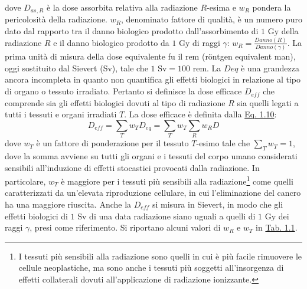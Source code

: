 \documentclass[12pt,a4paper,twoside]{report}
\begin{document}
	dove $D_{as,R}$ è la dose assorbita relativa alla radiazione $R$-esima e $w_R$ pondera la pericolosità della radiazione. $w_R$, denominato fattore di qualità, è un numero puro dato dal rapporto tra il danno biologico prodotto dall'assorbimento di $1\mbox{ Gy}$ della radiazione $R$ e il danno biologico prodotto da $1\mbox{ Gy}$ di raggi $\gamma$: $w_R=\frac{Danno(R)}{Danno(\gamma)}$. La prima unità di misura della dose equivalente fu il rem (röntgen equivalent man), oggi sostituito dal Sievert (Sv), tale che $1\mbox{ Sv}=100\mbox{ rem}$. La $D{eq}$ è una grandezza ancora incompleta in quanto non quantifica gli effetti biologici in relazione al tipo di organo o tessuto irradiato. Pertanto si definisce la dose efficace $D_{eff}$ che comprende sia gli effetti biologici dovuti al tipo di radiazione $R$ sia quelli legati a tutti i tessuti e organi irradiati $T$. La dose efficace è definita dalla \hyperref[eq:dose_eff]{Eq. 1.10}:
	\begin{equation}
		D_{eff}=\sum_{T}w_TD_{eq}=\sum_{T}w_T\sum_{R}w_RD
		\label{eq:dose_eff}
	\end{equation}
	dove $w_T$ è un fattore di ponderazione per il tessuto $T$-esimo tale che $\sum_{T}w_T=1$, dove la somma avviene su tutti gli organi e i tessuti del corpo umano considerati sensibili all'induzione di effetti stocastici provocati dalla radiazione. In particolare, $w_T$ è maggiore per i tessuti più sensibili alla radiazione\footnote{I tessuti più sensibili alla radiazione sono quelli in cui è più facile rimuovere le cellule neoplastiche, ma sono anche i tessuti più soggetti all'insorgenza di effetti collaterali dovuti all'applicazione di radiazione ionizzante.} come quelli caratterizzati da un'elevata riproduzione cellulare, in cui l'eliminazione del cancro ha una maggiore riuscita. Anche la $D_{eff}$ si misura in Sievert, in modo che gli effetti biologici di $1\mbox{ Sv}$ di una data radiazione siano uguali a quelli di $1\mbox{ Gy}$ dei raggi $\gamma$, presi come riferimento. Si riportano alcuni valori di $w_R$ e $w_T$ in \hyperref[tab:w_factor]{Tab. 1.1}.
	
\end{document}
